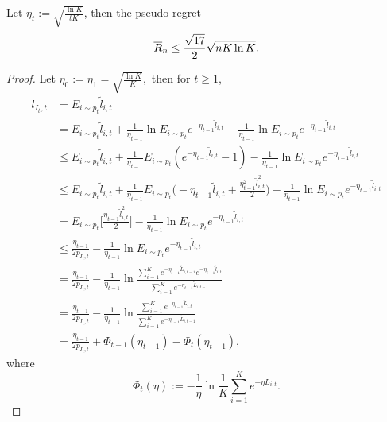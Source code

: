 \begin{thm}
    Let $\eta_t:=\sqrt{\frac{\ln K}{tK}}$, then the pseudo-regret
    \begin{equation}
        {\overline{R}}_n\le \frac{\sqrt{17}}{2}\sqrt{nK\ln K}.
    \end{equation}
\end{thm}
\begin{proof}
    Let $\eta_0:=\eta_1=\sqrt{\frac{\ln K}{K}},$
    then for $t\ge1$,
    \begin{align}
        l_{I_t,t}
            &= E_{i\sim p_t}\tilde l_{i,t} \\
            &= E_{i\sim p_t}\tilde l_{i,t}
                +\frac{1}{\eta_{t-1}}\ln E_{i\sim p_t}e^{-\eta_{t-1}\tilde l_{i,t}}
                -\frac{1}{\eta_{t-1}}\ln E_{i\sim p_t}e^{-\eta_{t-1}\tilde l_{i,t}}\\
            &\le  E_{i\sim p_t}\tilde l_{i,t}
                +\frac{1}{\eta_{t-1}} E_{i\sim p_t}(e^{-\eta_{t-1}\tilde l_{i,t}} - 1)
                -\frac{1}{\eta_{t-1}}\ln E_{i\sim p_t}e^{-\eta_{t-1}\tilde l_{i,t}}\\
            &\le E_{i\sim p_t}\tilde l_{i,t}
                +\frac{1}{\eta_{t-1}} E_{i\sim p_t}\bigg(-\eta_{t-1}\tilde l_{i,t}+\frac{\eta_{t-1}^2\tilde l_{i,t}^2}{2}\bigg)
                -\frac{1}{\eta_{t-1}}\ln E_{i\sim p_t}e^{-\eta_{t-1}\tilde l_{i,t}}\\
            &= E_{i\sim p_t}\bigg[\frac{\eta_{t-1}\tilde l_{i,t}^2}{2}\bigg]
                -\frac{1}{\eta_{t-1}}\ln E_{i\sim p_t}e^{-\eta_{t-1}\tilde l_{i,t}}\\
            &\le \frac{\eta_{t-1}}{2p_{I_t,t}}
                -\frac{1}{\eta_{t-1}}\ln E_{i\sim p_t}e^{-\eta_{t-1}\tilde l_{i,t}}\\
            &= \frac{\eta_{t-1}}{2p_{I_t,t}}
                -\frac{1}{\eta_{t-1}}\ln \frac{\sum_{i=1}^K e^{-\eta_{t-1}\tilde L_{i,t-1}}e^{-\eta_{t-1}\tilde l_{i,t}}}{\sum_{i=1}^K e^{-\eta_{t-1}\tilde L_{i,t-1}}} \\
            &= \frac{\eta_{t-1}}{2p_{I_t,t}}
                -\frac{1}{\eta_{t-1}}\ln \frac{\sum_{i=1}^K e^{-\eta_{t-1}\tilde L_{i,t}}}{\sum_{i=1}^K e^{-\eta_{t-1}\tilde L_{i,t-1}}} \\
            &= \frac{\eta_{t-1}}{2p_{I_t,t}} + \Phi_{t-1}(\eta_{t-1}) - \Phi_t(\eta_{t-1}),
    \end{align}
    where
    \begin{equation}
        \Phi_t(\eta):= -\frac{1}{\eta}\ln\frac{1}{K} \sum_{i=1}^K e^{-\eta\tilde L_{i,t}}.

\end{equation}
\end{proof}

